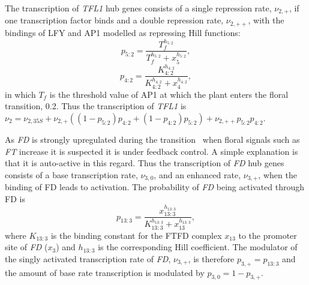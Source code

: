 The transcription of \emph{TFL1} hub genes consists of a single repression rate, $\nu_{2,+}$, if one transcription factor binds and a double repression rate, $\nu_{2,++}$, with the bindings of LFY and AP1 modelled as repressing Hill functions:
\begin{equation*}
p_{5:2} = \frac{T_f^{h_{5:2}}}{T_f^{h_{5:2}}+x_5^{h_{5:2}}},
\end{equation*}
\begin{equation*}
p_{4:2} = \frac{K_{4:2}^{h_{4:2}}}{K_{4:2}^{h_{4:2}} + x_4^{h_{4:2}}},
\end{equation*}
in which $T_f$ is the threshold value of AP1 at which the plant enters the floral transition, 0.2.
Thus the transcription of \emph{TFL1} is $\nu_2 = \nu_{2, \mathrm 35S} + \nu_{2,+}\left(\left(1 - p_{5:2}\right)p_{4:2} + \left(1 - p_{4:2}\right)p_{5:2}\right) + \nu_{2,++}p_{5:2}p_{4:2} $.

As \emph{FD} is strongly upregulated during the transition~\cite{wigge2005} when floral signals such as \emph{FT} increase it is suspected it is under feedback control.
A simple explanation is that it is auto-active in this regard.
Thus the transcription of \emph{FD} hub genes consists of a base transcription rate, $\nu_{3,0}$, and an enhanced rate, $\nu_{3,+}$, when the binding of FD leads to activation.
The probability of \emph{FD} being activated through FD is
\begin{equation*}
p_{13:3} = \frac{x_{13:3}^{h_{13:3}}}
{K_{13:3}^{h_{13:3}}+x_{13}^{h_{13:3}}},
\end{equation*}
where $K_{13:3}$ is the binding constant for the FTFD complex $x_{13}$ to the promoter site of \emph{FD} ($x_3$) and $h_{13:3}$ is the corresponding Hill coefficient.
The modulator of the singly activated transcription rate of \emph{FD}, $\nu_{3,+}$, is therefore $p_{3,+}=p_{13:3}$ and the amount of base rate transcription is modulated by $p_{3,0}=1-p_{3,+}$.

